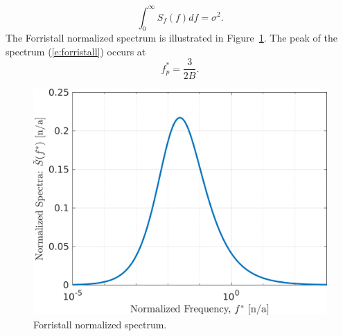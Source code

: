 \documentclass[utf8]{frontiersSCNS} %
\begin{document}
\begin{equation}
  \int_0^{\infty} S_f(f) df = \sigma^2.
\end{equation}
The Forristall normalized spectrum is illustrated in Figure~\ref{f:forristall_norm}.   The peak of the spectrum (\ref{e:forristall}) occurs at
\begin{equation}
f^*_p = \frac{3}{2B}.
\end{equation}
\begin{figure}[h!]
  \centering
  \includegraphics[width=\SFc\textwidth]{src/forristall_norm.png}
  \caption{Forristall normalized spectrum.}
  \label{f:forristall_norm}
\end{figure}
\end{document}
